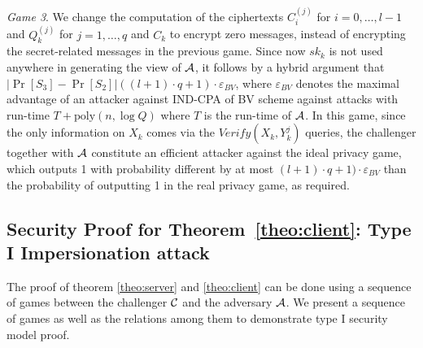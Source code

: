 \textit{Game 3}. We change the computation of the ciphertexts $C^{(j)}_i$ for $i=0,\ldots,l-1$ and $Q^{(j)}_k$ for
$j=1,\ldots,q$ and $C_k$ to encrypt zero messages, instead of encrypting the secret-related messages in the previous
game. Since now $sk_k$ is not used anywhere in generating the view of $\mathcal{A}$, it follows by a hybrid argument that
$|\Pr[S_3]-\Pr[S_2]| ((l+1) \cdot q + 1) \cdot \varepsilon_{BV}$, where $\varepsilon_{BV}$ denotes the maximal advantage
of an attacker against IND-CPA of BV scheme against attacks with run-time $T + \mathrm{poly}(n, \log Q)$ where $T$ is
the run-time of $\mathcal{A}$.  In this game, since the only information on $X_k$ comes via the $Verify(X_k,Y_k^{j})$
queries, the challenger together with $\mathcal{A}$ constitute an efficient attacker against the ideal privacy game, which
outputs 1 with probability different by at most $(l+1) \cdot q + 1) \cdot \varepsilon_{BV}$ than the probability of
outputting 1 in the real privacy game, as required.

\subsection{Security Proof for Theorem~\ref{theo:client}: Type I Impersionation attack}
The proof of theorem \ref{theo:server} and \ref{theo:client} can be done using a sequence of games between the
challenger $\mathcal{C}$ and the adversary $\mathcal{A}$. We present a sequence of games as well as the relations among
them to demonstrate type I security model proof.

